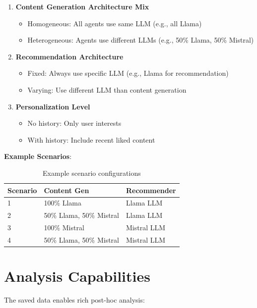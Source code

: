 \documentclass[11pt]{article}
\begin{document}
\begin{enumerate}
    \item \textbf{Content Generation Architecture Mix}
    \begin{itemize}
        \item Homogeneous: All agents use same LLM (e.g., all Llama)
        \item Heterogeneous: Agents use different LLMs (e.g., 50\% Llama, 50\% Mistral)
    \end{itemize}

    \item \textbf{Recommendation Architecture}
    \begin{itemize}
        \item Fixed: Always use specific LLM (e.g., Llama for recommendation)
        \item Varying: Use different LLM than content generation
    \end{itemize}

    \item \textbf{Personalization Level}
    \begin{itemize}
        \item No history: Only user interests
        \item With history: Include recent liked content
    \end{itemize}
\end{enumerate}

\textbf{Example Scenarios}:

\begin{table}[h]
\centering
\begin{tabular}{|l|l|l|}
\hline
\textbf{Scenario} & \textbf{Content Gen} & \textbf{Recommender} \\
\hline
1 & 100\% Llama & Llama LLM \\
2 & 50\% Llama, 50\% Mistral & Llama LLM \\
3 & 100\% Mistral & Mistral LLM \\
4 & 50\% Llama, 50\% Mistral & Mistral LLM \\
\hline
\end{tabular}
\caption{Example scenario configurations}
\end{table}

\section{Analysis Capabilities}

The saved data enables rich post-hoc analysis:
\end{document}
